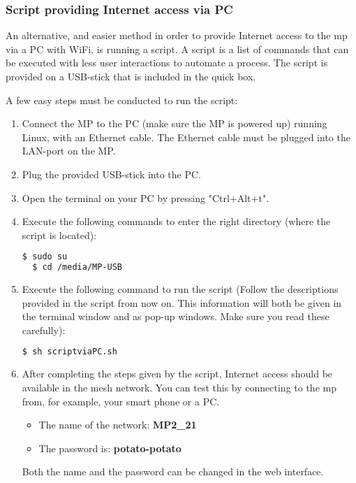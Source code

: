 \subsubsection{Script providing Internet access via PC}
\label{subsubsec:scriptvipc}

An alternative, and easier method in order to provide Internet access to the \gls{mp} via a PC with WiFi, is running a script. A script is a list of commands that can be executed with less user interactions to automate a process. The script is provided on a USB-stick that is included in the \gls{quick} box. 

A few easy steps must be conducted to run the script:
\begin{enumerate}
\item Connect the MP to the PC (make sure the MP is powered up) running Linux, with an Ethernet cable. The Ethernet cable must be plugged into the LAN-port on the MP.
\item Plug the provided USB-stick into the PC.  
\item Open the terminal on your PC by pressing "Ctrl+Alt+t". 
\item Execute the following commands to enter the right directory (where the script is located):
\noindent
\begin{lstlisting}[language=bash]
  $ sudo su
  $ cd /media/MP-USB
\end{lstlisting}
\item Execute the following command to run the script (Follow the descriptions provided in the script from now on. This information will both be given in the terminal window and as pop-up windows. Make sure you read these carefully):
\noindent
\begin{lstlisting}[language=bash]
  $ sh scriptviaPC.sh
\end{lstlisting}
\item After completing the steps given by the script, Internet access should be available in the mesh network. You can test this by connecting to the \gls{mp} from, for example, your smart phone or a PC. 
\begin{itemize}
\item The name of the network: \textbf{MP2_21}
\item The password is: \textbf{potato-potato}
\end{itemize}
Both the name and the password can be changed in the web interface. 
\end{enumerate}